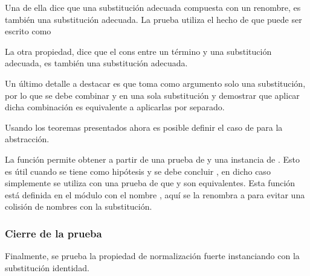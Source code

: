 Una de ella dice que una substitución adecuada compuesta con un renombre, es también una substitución adecuada.
La prueba utiliza el hecho de que   puede ser escrito como
\subst{\comp{\ids}{\bound{$\rho$}}}{}


La otra propiedad, dice que el cons entre un término \snstar y una substitución adecuada, es también una substitución adecuada.


Un último detalle a destacar es que  toma como argumento solo una substitución, por lo que se debe combinar \bound{$\sigma$} y
en una sola substitución y demostrar que aplicar dicha combinación es equivalente a aplicarlas por separado.



Usando los teoremas presentados ahora es posible definir el caso de  para la abstracción.

\begin{samepage}
\end{samepage}

La función  permite obtener  a partir de una prueba de  \type{$\cong$}  y una instancia de .
Esto es útil cuando se tiene como hipótesis \snstar {} y se debe concluir \snstar {}, en dicho caso simplemente se utiliza  con una prueba de que  y  son equivalentes.
Esta función está definida en el módulo  con el nombre , aquí se la renombra a  para evitar una colisión de nombres con la substitución.

\subsubsection{Cierre de la prueba}

Finalmente, se prueba la propiedad de normalización fuerte instanciando  con la substitución identidad.

